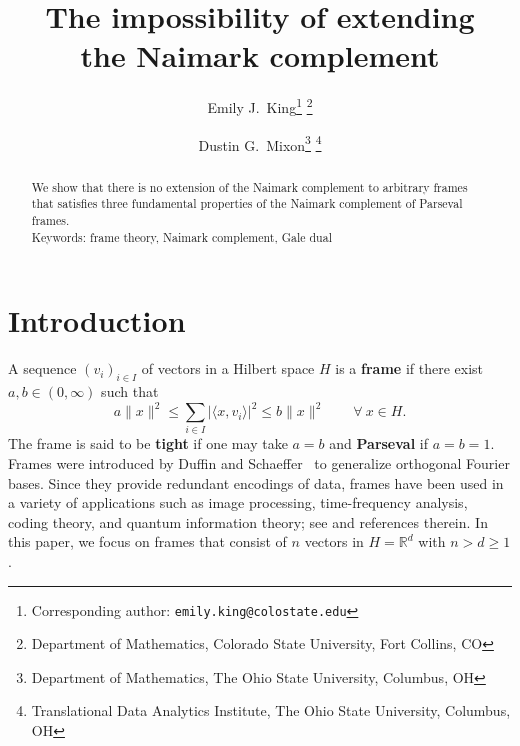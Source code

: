 \documentclass[12pt]{article}
\title{The impossibility of extending\\the Naimark complement}
\author{Emily J.\ King\thanks{Corresponding author: \texttt{emily.king@colostate.edu}} \thanks{Department of Mathematics, Colorado State University, Fort Collins, CO} \and Dustin G.\ Mixon\thanks{Department of Mathematics, The Ohio State University, Columbus, OH} \thanks{Translational Data Analytics Institute, The Ohio State University, Columbus, OH}}
\date{}
\theoremstyle{plain}
\theoremstyle{definition}
\theoremstyle{remark}
\begin{document}
\maketitle

\begin{abstract}
We show that there is no extension of the Naimark complement to arbitrary frames that satisfies three fundamental properties of the Naimark complement of Parseval frames.\\
Keywords: frame theory, Naimark complement, Gale dual
\end{abstract}

\section{Introduction}

A sequence $(v_i)_{i\in I}$ of vectors in a Hilbert space $H$ is a \textbf{frame} if there exist $a,b\in(0,\infty)$ such that
\[
a\|x\|^2
\leq \sum_{i\in I}|\langle x,v_i\rangle|^2
\leq b\|x\|^2
\qquad
\forall~x\in H.
\]
The frame is said to be \textbf{tight} if one may take $a=b$ and \textbf{Parseval} if $a=b=1$.
Frames were introduced by Duffin and Schaeffer~\cite{duffin1952class} to generalize orthogonal Fourier bases.
Since they provide redundant encodings of data, frames have been used in a variety of applications such as image processing, time-frequency analysis, coding theory, and quantum information theory; see \cite{casazza2013finite} and references therein.
In this paper, we focus on frames that consist of $n$ vectors in $H=\mathbb{R}^d$ with $n>d\geq1$.
\end{document}
